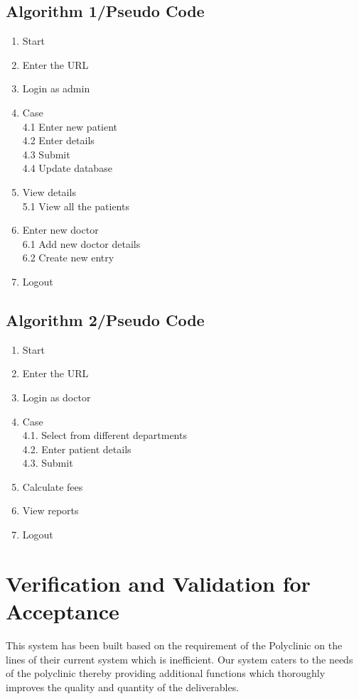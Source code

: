 \documentclass[oneside,a4paper,12pt]{book}
\begin{document}
  \subsection{Algorithm 1/Pseudo Code}
  \begin{enumerate}[1.]
\item	Start 
\item	Enter the URL
\item	Login as admin
\item	Case \\
4.1	Enter new patient \\
4.2	Enter details \\
4.3	Submit \\
4.4	Update database 
\item	View details \\
5.1	View all the patients
\item	Enter new doctor \\
6.1	Add new doctor details \\
6.2	Create new entry
\item	Logout
  \end{enumerate}



  \subsection{Algorithm 2/Pseudo Code}
  \begin{enumerate}
  \item Start
\item	Enter the URL
\item	Login as doctor
\item	Case \\
4.1.	Select from different departments \\
4.2.	Enter patient details \\
4.3.	Submit
\item	Calculate fees
\item	View reports
\item	Logout
  \end{enumerate}

  \section{Verification and Validation for Acceptance}
  This system has been built based on the requirement of the Polyclinic on the lines of their current system which is inefficient. Our system caters to the needs of the polyclinic thereby providing additional functions which thoroughly improves the quality and quantity of the deliverables.
  
\end{document}
